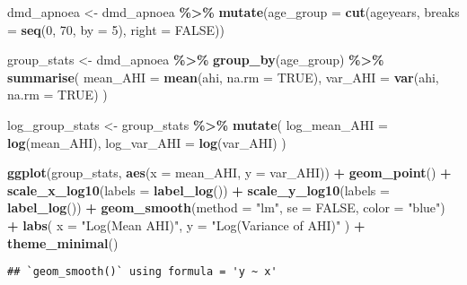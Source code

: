 \documentclass[
]{article}
\newenvironment{Shaded}{\begin{snugshade}}{\end{snugshade}}
\newcommand{\AttributeTok}[1]{\textcolor[rgb]{0.13,0.29,0.53}{#1}}
\newcommand{\ConstantTok}[1]{\textcolor[rgb]{0.56,0.35,0.01}{#1}}
\newcommand{\DecValTok}[1]{\textcolor[rgb]{0.00,0.00,0.81}{#1}}
\newcommand{\FunctionTok}[1]{\textcolor[rgb]{0.13,0.29,0.53}{\textbf{#1}}}
\newcommand{\NormalTok}[1]{#1}
\newcommand{\OtherTok}[1]{\textcolor[rgb]{0.56,0.35,0.01}{#1}}
\newcommand{\SpecialCharTok}[1]{\textcolor[rgb]{0.81,0.36,0.00}{\textbf{#1}}}
\newcommand{\StringTok}[1]{\textcolor[rgb]{0.31,0.60,0.02}{#1}}
\begin{document}
\begin{Shaded}
\begin{Highlighting}[]
\NormalTok{dmd\_apnoea }\OtherTok{\textless{}{-}}\NormalTok{ dmd\_apnoea }\SpecialCharTok{\%\textgreater{}\%}
  \FunctionTok{mutate}\NormalTok{(}\AttributeTok{age\_group =} \FunctionTok{cut}\NormalTok{(ageyears, }\AttributeTok{breaks =} \FunctionTok{seq}\NormalTok{(}\DecValTok{0}\NormalTok{, }\DecValTok{70}\NormalTok{, }\AttributeTok{by =} \DecValTok{5}\NormalTok{), }\AttributeTok{right =} \ConstantTok{FALSE}\NormalTok{))}

\NormalTok{group\_stats }\OtherTok{\textless{}{-}}\NormalTok{ dmd\_apnoea }\SpecialCharTok{\%\textgreater{}\%}
  \FunctionTok{group\_by}\NormalTok{(age\_group) }\SpecialCharTok{\%\textgreater{}\%}
  \FunctionTok{summarise}\NormalTok{(}
    \AttributeTok{mean\_AHI =} \FunctionTok{mean}\NormalTok{(ahi, }\AttributeTok{na.rm =} \ConstantTok{TRUE}\NormalTok{),}
    \AttributeTok{var\_AHI =} \FunctionTok{var}\NormalTok{(ahi, }\AttributeTok{na.rm =} \ConstantTok{TRUE}\NormalTok{)}
\NormalTok{  )}

\NormalTok{log\_group\_stats }\OtherTok{\textless{}{-}}\NormalTok{ group\_stats }\SpecialCharTok{\%\textgreater{}\%}
  \FunctionTok{mutate}\NormalTok{(}
    \AttributeTok{log\_mean\_AHI =} \FunctionTok{log}\NormalTok{(mean\_AHI),}
    \AttributeTok{log\_var\_AHI =} \FunctionTok{log}\NormalTok{(var\_AHI)}
\NormalTok{  )}

\FunctionTok{ggplot}\NormalTok{(group\_stats, }\FunctionTok{aes}\NormalTok{(}\AttributeTok{x =}\NormalTok{ mean\_AHI, }\AttributeTok{y =}\NormalTok{ var\_AHI)) }\SpecialCharTok{+}
  \FunctionTok{geom\_point}\NormalTok{() }\SpecialCharTok{+}
  \FunctionTok{scale\_x\_log10}\NormalTok{(}\AttributeTok{labels =} \FunctionTok{label\_log}\NormalTok{()) }\SpecialCharTok{+}  
  \FunctionTok{scale\_y\_log10}\NormalTok{(}\AttributeTok{labels =} \FunctionTok{label\_log}\NormalTok{()) }\SpecialCharTok{+} 
   \FunctionTok{geom\_smooth}\NormalTok{(}\AttributeTok{method =} \StringTok{"lm"}\NormalTok{, }\AttributeTok{se =} \ConstantTok{FALSE}\NormalTok{, }\AttributeTok{color =} \StringTok{"blue"}\NormalTok{) }\SpecialCharTok{+}
  \FunctionTok{labs}\NormalTok{(}
    \AttributeTok{x =} \StringTok{"Log(Mean AHI)"}\NormalTok{,}
    \AttributeTok{y =} \StringTok{"Log(Variance of AHI)"}
\NormalTok{  ) }\SpecialCharTok{+}
  \FunctionTok{theme\_minimal}\NormalTok{()}
\end{Highlighting}
\end{Shaded}

\begin{verbatim}
## `geom_smooth()` using formula = 'y ~ x'
\end{verbatim}
\end{document}
